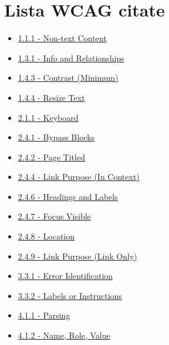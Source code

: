 \chapter{Lista WCAG citate}
\label{cap:wcag}

\begin{itemize}
    \item \label{wcag:1.1.1} \href{https://www.w3.org/TR/WCAG21/#non-text-content}{1.1.1 - Non-text Content}
    \item \label{wcag:1.3.1} \href{https://www.w3.org/TR/WCAG21/#info-and-relationships}{1.3.1 - Info and Relationships}
    \item \label{wcag:1.4.3} \href{https://www.w3.org/TR/WCAG21/#contrast-minimum}{1.4.3 - Contrast (Minimum)}
    \item \label{wcag:1.4.4} \href{https://www.w3.org/TR/WCAG21/#resize-text}{1.4.4 - Resize Text}
    \item \label{wcag:2.1.1} \href{https://www.w3.org/TR/WCAG21/#keyboard}{2.1.1 - Keyboard}
    \item \label{wcag:2.4.1} \href{https://www.w3.org/TR/WCAG21/#bypass-blocks}{2.4.1 - Bypass Blocks}
    \item \label{wcag:2.4.2} \href{https://www.w3.org/TR/WCAG21/#page-titled}{2.4.2 - Page Titled}
    \item \label{wcag:2.4.4} \href{https://www.w3.org/TR/WCAG21/#link-purpose-in-context}{2.4.4 - Link Purpose (In Context)}
    \item \label{wcag:2.4.6} \href{https://www.w3.org/TR/WCAG21/#headings-and-labels}{2.4.6 - Headings and Labels}
    \item \label{wcag:2.4.7} \href{https://www.w3.org/TR/WCAG21/#focus-visible}{2.4.7 - Focus Visible}
    \item \label{wcag:2.4.8} \href{https://www.w3.org/TR/WCAG21/#location}{2.4.8 - Location}
    \item \label{wcag:2.4.9} \href{https://www.w3.org/TR/WCAG21/#link-purpose-link-only}{2.4.9 - Link Purpose (Link Only)}
    \item \label{wcag:3.3.1} \href{https://www.w3.org/TR/WCAG21/#error-identification}{3.3.1 - Error Identification}
    \item \label{wcag:3.3.2} \href{https://www.w3.org/TR/WCAG21/#labels-or-instructions}{3.3.2 - Labels or Instructions}
    \item \label{wcag:4.1.1} \href{https://www.w3.org/TR/WCAG21/#parsing}{4.1.1 - Parsing}
    \item \label{wcag:4.1.2} \href{https://www.w3.org/TR/WCAG21/#name-role-value}{4.1.2 - Name, Role, Value}
\end{itemize}